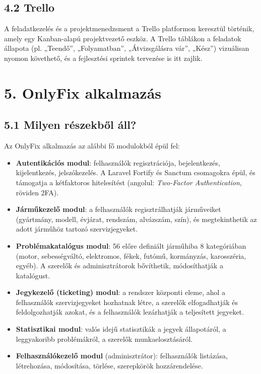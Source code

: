 \section{4.2 Trello}\label{trello}

A feladatkezelés és a projektmenedzsment a Trello platformon keresztül történik, amely egy Kanban-alapú projektvezető eszköz. A Trello táblákon a feladatok állapota (pl. „Teendő'', „Folyamatban'', „Átvizsgálásra vár'', „Kész'') vizuálisan nyomon követhető, és a fejlesztési sprintek tervezése is itt zajlik.

\protect{}\label{_Toc223012186}{}

\chapter{5. OnlyFix alkalmazás}\label{onlyfix-alkalmazuxe1s}

\section{5.1 Milyen részekből áll?}\label{milyen-ruxe9szekbux151l-uxe1ll}

Az OnlyFix alkalmazás az alábbi fő modulokból épül fel:

\begin{itemize}
\item
  \textbf{Autentikációs modul}: felhasználók regisztrációja, bejelentkezés, kijelentkezés, jelszókezelés. A Laravel Fortify és Sanctum csomagokra épül, és támogatja a kétfaktoros hitelesítést (angolul: \emph{Two-Factor Authentication}, röviden 2FA).
\item
  \textbf{Járműkezelő modul}: a felhasználók regisztrálhatják járműveiket (gyártmány, modell, évjárat, rendszám, alvázszám, szín), és megtekinthetik az adott járműhöz tartozó szervizjegyeket.
\item
  \textbf{Problémakatalógus modul}: 56 előre definiált járműhiba 8 kategóriában (motor, sebességváltó, elektromos, fékek, futómű, kormányzás, karosszéria, egyéb). A szerelők és adminisztrátorok bővíthetik, módosíthatják a katalógust.
\item
  \textbf{Jegykezelő (ticketing) modul}: a rendszer központi eleme, ahol a felhasználók szervizjegyeket hozhatnak létre, a szerelők elfogadhatják és feldolgozhatják azokat, és a felhasználók lezárhatják a teljesített jegyeket.
\item
  \textbf{Statisztikai modul}: valós idejű statisztikák a jegyek állapotáról, a leggyakoribb problémákról, a szerelők munkaelosztásáról.
\item
  \textbf{Felhasználókezelő modul} (adminisztrátor): felhasználók listázása, létrehozása, módosítása, törlése, szerepkörök hozzárendelése.
\end{itemize}

